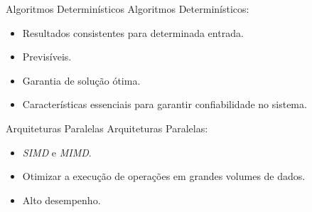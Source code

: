 
\begin{frame}{Algoritmos Determinísticos}
    Algoritmos Determinísticos:

    \begin{itemize}
        \item Resultados consistentes para determinada entrada.
        \item Previsíveis.
        \item Garantia de solução ótima.
        \item Características essenciais para garantir confiabilidade no sistema.
    \end{itemize}
\end{frame}

\begin{frame}{Arquiteturas Paralelas}
    Arquiteturas Paralelas:

    \begin{itemize}
        \item \textit{SIMD} e \textit{MIMD}.
        \item Otimizar a execução de operações em grandes volumes de dados.
        \item Alto desempenho.
    \end{itemize}
\end{frame}

